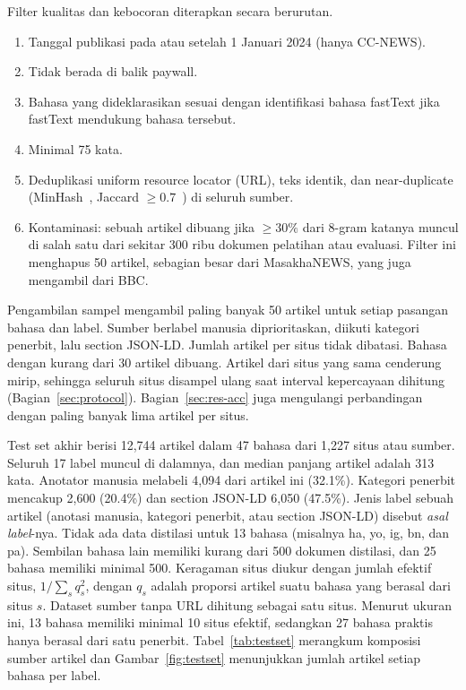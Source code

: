 \documentclass[journal]{IEEEtran}
\begin{document}
Filter kualitas dan kebocoran diterapkan secara berurutan.
\begin{enumerate}
  \item Tanggal publikasi pada atau setelah 1 Januari 2024 (hanya CC-NEWS).
  \item Tidak berada di balik paywall.
  \item Bahasa yang dideklarasikan sesuai dengan identifikasi bahasa fastText jika fastText mendukung bahasa tersebut.
  \item Minimal 75 kata.
  \item Deduplikasi uniform resource locator (URL), teks identik, dan near-duplicate (MinHash~\cite{broder1997resemblance}, Jaccard $\ge 0.7$~\cite{lee2022dedup}) di seluruh sumber.
  \item Kontaminasi: sebuah artikel dibuang jika $\ge 30\%$ dari 8-gram katanya muncul di salah satu dari sekitar 300 ribu dokumen pelatihan atau evaluasi. Filter ini menghapus 50 artikel, sebagian besar dari MasakhaNEWS, yang juga mengambil dari BBC.
\end{enumerate}

Pengambilan sampel mengambil paling banyak 50 artikel untuk setiap pasangan bahasa dan label. Sumber berlabel manusia diprioritaskan, diikuti kategori penerbit, lalu section JSON-LD. Jumlah artikel per situs tidak dibatasi. Bahasa dengan kurang dari 30 artikel dibuang. Artikel dari situs yang sama cenderung mirip, sehingga seluruh situs disampel ulang saat interval kepercayaan dihitung (Bagian~\ref{sec:protocol}). Bagian~\ref{sec:res-acc} juga mengulangi perbandingan dengan paling banyak lima artikel per situs.

Test set akhir berisi 12,744 artikel dalam 47 bahasa dari 1,227 situs atau sumber. Seluruh 17 label muncul di dalamnya, dan median panjang artikel adalah 313 kata. Anotator manusia melabeli 4,094 dari artikel ini (32.1\%). Kategori penerbit mencakup 2,600 (20.4\%) dan section JSON-LD 6,050 (47.5\%). Jenis label sebuah artikel (anotasi manusia, kategori penerbit, atau section JSON-LD) disebut \emph{asal label}-nya. Tidak ada data distilasi untuk 13 bahasa (misalnya ha, yo, ig, bn, dan pa). Sembilan bahasa lain memiliki kurang dari 500 dokumen distilasi, dan 25 bahasa memiliki minimal 500. Keragaman situs diukur dengan jumlah efektif situs, $1/\sum_s q_s^{2}$, dengan $q_s$ adalah proporsi artikel suatu bahasa yang berasal dari situs $s$. Dataset sumber tanpa URL dihitung sebagai satu situs. Menurut ukuran ini, 13 bahasa memiliki minimal 10 situs efektif, sedangkan 27 bahasa praktis hanya berasal dari satu penerbit. Tabel~\ref{tab:testset} merangkum komposisi sumber artikel dan Gambar~\ref{fig:testset} menunjukkan jumlah artikel setiap bahasa per label.
\end{document}
